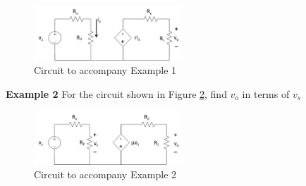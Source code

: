 \documentclass{handout}
\begin{document}
\begin{figure} [h! t! b!]
\centering
\includegraphics[width=0.5\textwidth]{Example1.jpg}
\caption{Circuit to accompany Example 1}
\label{fig: Example1}
\end{figure}

\newpage
\clearpage
\pagebreak

\textbf{Example 2}
For the circuit shown in Figure \ref{fig: Example2}, find $v_o$ in terms of $v_s$

\begin{figure}[h! t! b!]
\centering
\includegraphics[width=0.5\textwidth]{Example2.jpg}
\caption{Circuit to accompany Example 2}
\label{fig: Example2}
\end{figure}
\end{document}
